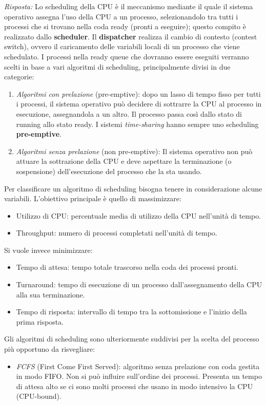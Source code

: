 \documentclass{article}
\newenvironment{solution}
    {\textit{Risposta:}}
    {}
\begin{document}
\begin{solution}
Lo scheduling della CPU è il meccanismo mediante il quale il sistema operativo assegna l’uso della CPU a un processo, selezionandolo tra tutti i processi che si trovano nella coda ready (pronti a eseguire); questo compito è realizzato dallo \textbf{scheduler}.
\newline
\newline
Il \textbf{dispatcher} realizza il cambio di contesto (contest switch), ovvero il caricamento delle variabili locali di un processo che viene schedulato.
\newline
\newline
I processi nella ready queue che dovranno essere eseguiti verranno scelti in base a vari algoritmi di scheduling, principalmente divisi in due categorie:
\begin{enumerate}
    \item \emph{Algoritmi con prelazione} (pre-emptive): dopo un lasso di tempo fisso per tutti i processi, il sistema operativo può decidere di sottrarre la CPU al processo in esecuzione, assegnandola a un altro. Il processo passa così dallo stato di running allo stato ready.
    \newline
    I sistemi \textit{time-sharing} hanno sempre uno scheduling \textbf{pre-emptive}.

    \item \emph{Algoritmi senza prelazione} (non pre-emptive): Il sistema operativo non può attuare la sottrazione della CPU e deve aspettare la terminazione (o sospensione) dell’esecuzione del processo che la sta usando.
\end{enumerate}
Per classificare un algoritmo di scheduling bisogna tenere in considerazione alcune variabili.  L’obiettivo principale è quello di massimizzare:
\begin{itemize}
    \item Utilizzo di CPU: percentuale media di utilizzo della CPU nell’unità di tempo.
    \item Throughput: numero di processi completati nell’unità di tempo.
\end{itemize}
Si vuole invece minimizzare:
\begin{itemize}
    \item Tempo di attesa: tempo totale trascorso nella coda dei processi pronti.
    \item Turnaround: tempo di esecuzione di un processo dall’assegnamento della CPU alla sua terminazione.
    \item Tempo di risposta: intervallo di tempo tra la sottomissione e l’inizio della prima risposta.
\end{itemize}
Gli algoritmi di scheduling sono ulteriormente suddivisi per la scelta del processo più opportuno da risvegliare:
\begin{itemize}
    \item \emph{FCFS} (First Come First Served): algoritmo senza prelazione con coda gestita in modo FIFO.
    \newline
    Non si può influire sull’ordine dei processi. Presenta un tempo di attesa alto se ci sono molti processi che usano in modo intensivo la CPU (CPU-bound).


\end{itemize}
\end{solution}
\end{document}
